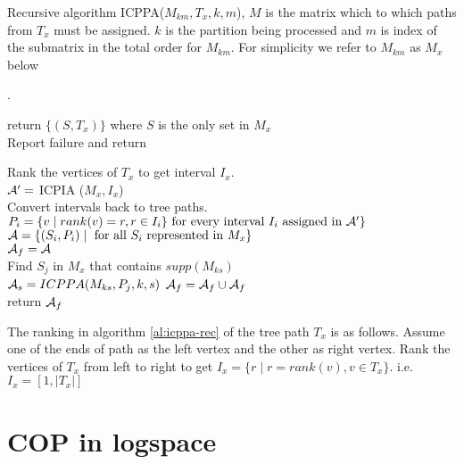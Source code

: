 \documentclass{llncs}
\def\cA{{\cal A}}
\begin{document}
\begin{algorithm}[h]
\caption{Recursive algorithm ICPPA($M_{km}, T_x, k, m$), $M$ is the matrix which to which
  paths from $T_x$ must be assigned. $k$ is the partition being
  processed and $m$ is index of the submatrix in the total order for
  $M_{km}$. For simplicity we refer to $M_{km}$ as $M_x$ below}. 
\label{al:icppa-rec}

\begin{algorithmic}
\STATE return $\{(S, T_x)\}$ where $S$ is the only set in $M_x$\\
\ELSE
{}
\STATE Report failure and return
\ENDIF
\ENDIF

\STATE Rank the vertices of $T_x$ to get interval $I_x$.\\
\STATE $\cA' = $ ICPIA ($M_x, I_x$)\\
\STATE Convert intervals back to tree paths. $P_i = \{ v \mid rank(v)
= r, r \in I_i\} \text{ for every interval } I_i \text{ assigned in } \cA' \}$\\
\STATE $\cA = \{(S_i,P_i) \mid \text{ for all } S_i \text{ represented in }M_x\}$\\
\STATE $\cA_f = \cA$\\
\STATE  Find $S_j$ in $M_x$ that contains $supp(M_{ks})$\\
\STATE $\cA_s = ICPPA(M_{ks}, P_j, k, s)$
\STATE $\cA_f = \cA_f \cup \cA_f$
\ENDIF
\ENDFOR \\
return $\cA_f$
\end{algorithmic}  
\end{algorithm}

The ranking in algorithm \ref{al:icppa-rec} of the tree path $T_{x}$
is as follows. Assume one of the ends of path as the left vertex and the other as
right vertex. Rank the vertices of $T_x$ from left to right to get $I_x =
\{r \mid r = rank(v), v \in T_x\}$. i.e. $I_x = [1, |T_x|]$


\section{COP in logspace}
\end{document}
